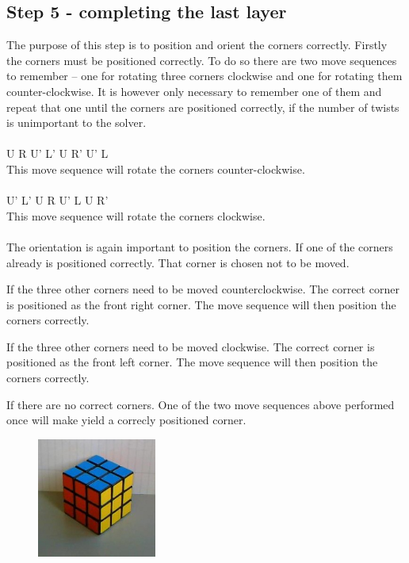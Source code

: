 \subsection{Step 5 - completing the last layer}
The purpose of this step is to position and orient the corners correctly. Firstly the corners must be positioned correctly. To do so there are two move sequences to remember -- one for rotating three corners clockwise and one for rotating them counter-clockwise. It is however only necessary to remember one of them and repeat that one until the corners are positioned correctly, if the number of twists is unimportant to the solver. \\
\\
U R U' L' U R' U' L
\\
This move sequence will rotate the corners counter-clockwise.
\\
\\
U' L' U R U' L U R'
\\
This move sequence will rotate the corners clockwise.
\\
\\
The orientation is again important to position the corners. If one of the corners already is positioned correctly. That corner is chosen not to be moved. 

If the three other corners need to be moved counterclockwise. The correct corner is positioned as the front right corner. The move sequence will then position the corners correctly.

If the three other corners need to be moved clockwise. The correct corner is positioned as the front left corner. The move sequence will then position the corners correctly.

If there are no correct corners. One of the two move sequences above performed once will make yield a correcly positioned corner.

\begin{figure}
\begin{center}
	\includegraphics[width=0.35\textwidth]{input/pics/8done.jpg}	
\end{center}
\caption{}
\label{fig:8done}
\end{figure}

